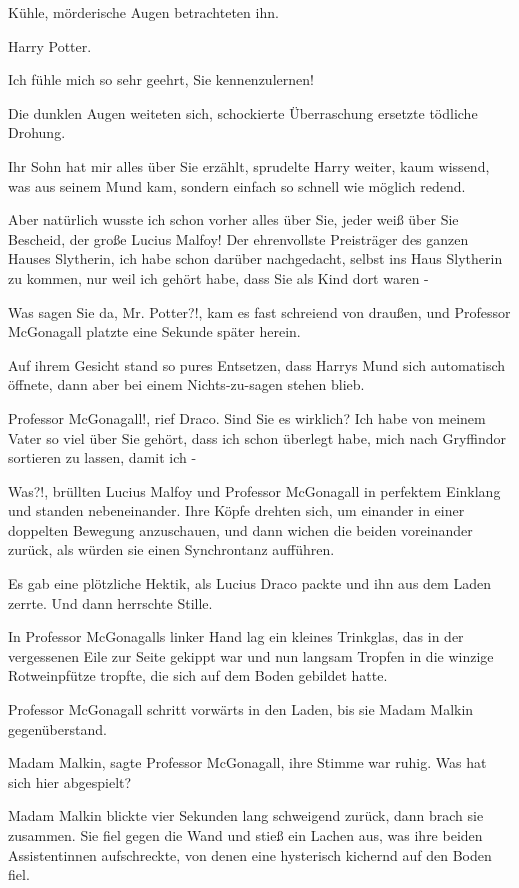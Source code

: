 Kühle, mörderische Augen betrachteten ihn.

\glqq{}Harry Potter.\grqq{}

\glqq{}Ich fühle mich so sehr geehrt, Sie kennenzulernen!\grqq{}

Die dunklen Augen weiteten sich, schockierte Überraschung ersetzte tödliche
Drohung.

\glqq{}Ihr Sohn hat mir alles über Sie erzählt\grqq{}, sprudelte Harry weiter,
kaum wissend, was aus seinem Mund kam, sondern einfach so schnell wie möglich
redend.

\glqq{}Aber natürlich wusste ich schon vorher alles über Sie, jeder weiß über Sie
Bescheid, der große Lucius Malfoy! Der ehrenvollste Preisträger des ganzen
Hauses Slytherin, ich habe schon darüber nachgedacht, selbst ins Haus Slytherin
zu kommen, nur weil ich gehört habe, dass Sie als Kind dort waren -\grqq{}

\glqq{}Was sagen Sie da, Mr. Potter?!\grqq{}, kam es fast schreiend von draußen,
und Professor McGonagall platzte eine Sekunde später herein.

Auf ihrem Gesicht stand so pures Entsetzen, dass Harrys Mund sich automatisch
öffnete, dann aber bei einem Nichts-zu-sagen stehen blieb.

\glqq{}Professor McGonagall!\grqq{}, rief Draco. \glqq{}Sind Sie es wirklich? Ich
habe von meinem Vater so viel über Sie gehört, dass ich schon überlegt habe,
mich nach Gryffindor sortieren zu lassen, damit ich -\grqq{}

\glqq{}Was?!,\grqq{} brüllten Lucius Malfoy und Professor McGonagall in perfektem
Einklang und standen nebeneinander. Ihre Köpfe drehten sich, um einander in
einer doppelten Bewegung anzuschauen, und dann wichen die beiden voreinander
zurück, als würden sie einen Synchrontanz aufführen.

Es gab eine plötzliche Hektik, als Lucius Draco packte und ihn aus dem Laden
zerrte. Und dann herrschte Stille.

In Professor McGonagalls linker Hand lag ein kleines Trinkglas, das in der
vergessenen Eile zur Seite gekippt war und nun langsam Tropfen in die winzige
Rotweinpfütze tropfte, die sich auf dem Boden gebildet hatte.

Professor McGonagall schritt vorwärts in den Laden, bis sie Madam Malkin
gegenüberstand.

\glqq{}Madam Malkin\grqq{}, sagte Professor McGonagall, ihre Stimme war ruhig.
\glqq{}Was hat sich hier abgespielt?\grqq{}

Madam Malkin blickte vier Sekunden lang schweigend zurück, dann brach sie
zusammen. Sie fiel gegen die Wand und stieß ein Lachen aus, was ihre beiden
Assistentinnen aufschreckte, von denen eine hysterisch kichernd auf den Boden
fiel.

